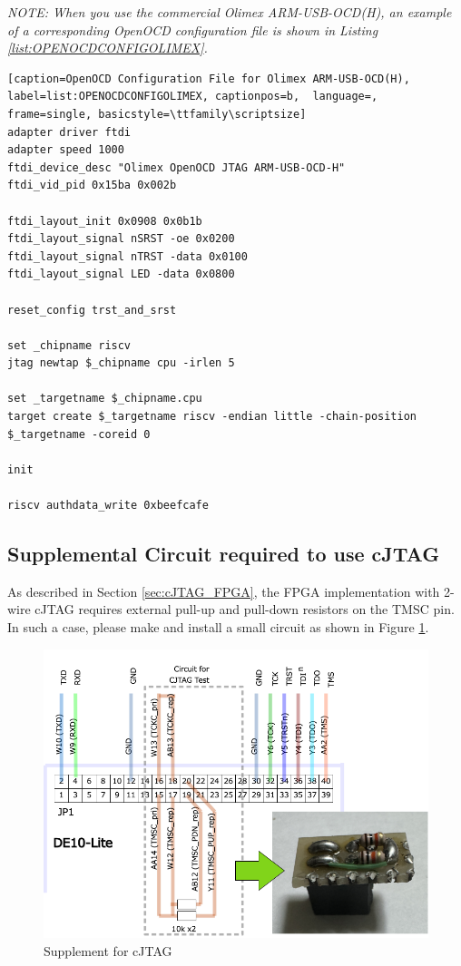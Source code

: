 \textit{NOTE: When you use the commercial Olimex ARM-USB-OCD(H), an example of a corresponding OpenOCD configuration file is shown in Listing \ref{list:OPENOCDCONFIGOLIMEX}.}

\begin{lstlisting}[caption=OpenOCD Configuration File for Olimex ARM-USB-OCD(H), label=list:OPENOCDCONFIGOLIMEX, captionpos=b,  language=, frame=single, basicstyle=\ttfamily\scriptsize]
adapter driver ftdi
adapter speed 1000
ftdi_device_desc "Olimex OpenOCD JTAG ARM-USB-OCD-H"
ftdi_vid_pid 0x15ba 0x002b

ftdi_layout_init 0x0908 0x0b1b
ftdi_layout_signal nSRST -oe 0x0200
ftdi_layout_signal nTRST -data 0x0100
ftdi_layout_signal LED -data 0x0800

reset_config trst_and_srst

set _chipname riscv
jtag newtap $_chipname cpu -irlen 5

set _targetname $_chipname.cpu
target create $_targetname riscv -endian little -chain-position $_targetname -coreid 0

init

riscv authdata_write 0xbeefcafe
\end{lstlisting}


\subsection{Supplemental Circuit required to use cJTAG}

As described in Section \ref{sec:cJTAG_FPGA}, the FPGA implementation with 2-wire cJTAG requires external pull-up and pull-down resistors on the TMSC pin. In such a case, please make and install a small circuit as shown in Figure \ref{fig:USBCJTAGSUPPLEMENT}.

\begin{figure}[H]
    \includegraphics[width=1.0\columnwidth]{./Figure/USB_cJTAG_Supplement.png}
    \caption{Supplement for cJTAG}
    \label{fig:USBCJTAGSUPPLEMENT}
\end{figure}


